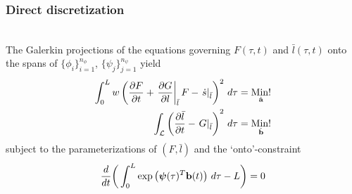 \documentclass[10pt,xcolor=dvipsnames]{beamer}
\renewcommand{\cite}{\parencite}
\begin{document}

\begin{frame}[t]

  \frametitle{Direct discretization}
  
  \justifying{}\\
  The Galerkin projections of the equations governing $F(\tau, t)$ and $\bar{l}(\tau, t)$ onto the spans of $\{\phi_i\}_{i = 1}^{n_\phi}$, $\{\psi_j\}_{j = 1}^{n_\psi}$ yield \cite{Miller1981}
  \begin{align*}
    \int_{0}^{L} w \left(\frac{\partial F}{\partial t} 
    + \left.\frac{\partial G}{\partial l}\right|_{\bar{l}} F - \left.\dot{s}\right|_{\bar{l}} \right)^2 \, d\tau 
    &= \underset{\dot{{\mathbf a}}}{\text{Min!}} \\
    \int_{{\mathcal L}} \left(\frac{\partial\bar{l}}{\partial t} - \left.G\right|_{\bar{l}}\right)^2 \, d\tau 
    &= \underset{\dot{{\mathbf b}}}{\text{Min!}}
  \end{align*}
  subject to the parameterizations of $(F, \bar{l})$ and the `onto'-constraint
  \begin{equation*}
    \frac{d}{dt} \bigg(\int_{0}^{L} \exp\left({\boldsymbol \psi}(\tau)^T{\mathbf b}(t)\right) \, d\tau - L\bigg) = 0
  \end{equation*}
  \begin{center}
  \resizebox{0.99\columnwidth}{!}{}
  \end{center}
  
\end{frame}

\end{document}
